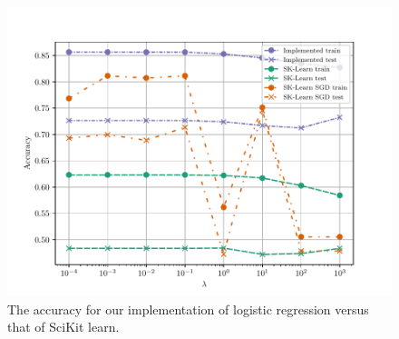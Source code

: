 \begin{figure}[H]
    \centering
    \includegraphics[scale=1.0]{../fig/logistic_accuracy_sklearn_comparison.pdf}
    \caption{The accuracy for our implementation of logistic regression versus that of SciKit learn.}
    \label{fig:logreg-accuracy-sklearn-comparison}
\end{figure}

